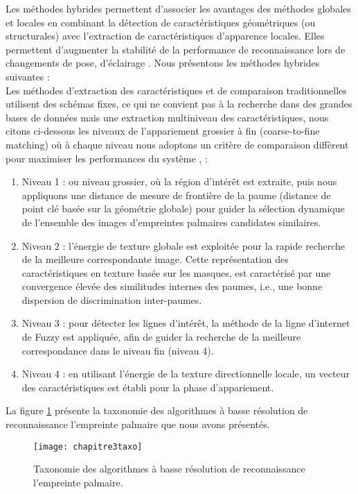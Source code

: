 Les méthodes hybrides permettent d’associer les avantages des méthodes globales et locales en combinant la détection de caractéristiques géométriques (ou structurales) avec l’extraction de caractéristiques d’apparence locales. Elles permettent d’augmenter la stabilité de la performance de reconnaissance lors de changements de pose, d’éclairage \citep{meyer2009}. Nous présentons les méthodes hybrides suivantes :
\\
Les méthodes d’extraction des caractéristiques et de comparaison traditionnelles utilisent des schémas fixes, ce qui ne convient pas à la recherche dans des grandes bases de données mais une 
extraction multiniveau des caractéristiques, nous citons ci-dessous les niveaux de l’appariement grossier à fin (coarse-to-fine matching) où à chaque niveau nous adoptons un critère de comparaison diffèrent pour maximiser les performances du système \citep{zhang2004hierarchical} , \citep{you2004On} :

\begin{enumerate}
	\item Niveau 1 : ou niveau grossier, où la région d’intérêt est extraite, puis nous appliquons une distance de mesure de frontière de la paume (distance de point clé basée sur la géométrie globale) pour guider la sélection dynamique de l’ensemble des images d’empreintes palmaires candidates similaires.
	\item Niveau 2 : l’énergie de texture globale est exploitée pour la rapide recherche de la meilleure correspondante image. Cette représentation des caractéristiques en texture basée sur les masques, est caractérisé par une convergence élevée des similitudes internes des paumes, i.e., une bonne dispersion de discrimination inter-paumes.
	\item Niveau 3 : pour détecter les lignes d’intérêt, la méthode de la ligne d’internet de Fuzzy est appliquée, afin de guider la recherche de la meilleure correspondance dans le niveau fin (niveau 4).
	\item Niveau 4 : en utilisant l’énergie de la texture directionnelle locale, un vecteur des caractéristiques est établi pour la phase d’appariement.
\end{enumerate}

La figure \ref{fig:chapitre3taxo} présente la taxonomie des algorithmes à basse résolution de reconnaissance l'empreinte palmaire que nous avons présentés.
\begin{center}
	\begin{figure}[H]
		\centering
		\texttt{[image: chapitre3taxo]}
		\captionsetup{justification=centering}
		\caption{Taxonomie des algorithmes à basse résolution de reconnaissance l'empreinte palmaire.}
		\label{fig:chapitre3taxo}
	\end{figure}
\end{center}

